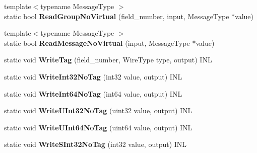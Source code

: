 \begin{DoxyCompactItemize}
{\footnotesize template$<$typename Message\+Type $>$ }\\static bool {\bfseries Read\+Group\+No\+Virtual} (field\+\_\+number, input, Message\+Type $\ast$value)
\item 
\mbox{\label{classgoogle_1_1protobuf_1_1internal_1_1WireFormatLite_a37b58a9b4cd56806106bdeffe647340e}} 
{\footnotesize template$<$typename Message\+Type $>$ }\\static bool {\bfseries Read\+Message\+No\+Virtual} (input, Message\+Type $\ast$value)
\item 
\mbox{\label{classgoogle_1_1protobuf_1_1internal_1_1WireFormatLite_a213c9236ebd73d84441a0db5688ee744}} 
static void {\bfseries Write\+Tag} (field\+\_\+number, Wire\+Type type, output) I\+NL
\item 
\mbox{\label{classgoogle_1_1protobuf_1_1internal_1_1WireFormatLite_a67e66c3c9d0e4c9487b271aae9b150bb}} 
static void {\bfseries Write\+Int32\+No\+Tag} (int32 value, output) I\+NL
\item 
\mbox{\label{classgoogle_1_1protobuf_1_1internal_1_1WireFormatLite_ae6fa7423cbae90a63ae35814c983c592}} 
static void {\bfseries Write\+Int64\+No\+Tag} (int64 value, output) I\+NL
\item 
\mbox{\label{classgoogle_1_1protobuf_1_1internal_1_1WireFormatLite_a0f9fbf660fc2eafb11559a65ff24be3f}} 
static void {\bfseries Write\+U\+Int32\+No\+Tag} (uint32 value, output) I\+NL
\item 
\mbox{\label{classgoogle_1_1protobuf_1_1internal_1_1WireFormatLite_a7845bbe461a6947f36475a345afa67ab}} 
static void {\bfseries Write\+U\+Int64\+No\+Tag} (uint64 value, output) I\+NL
\item 
\mbox{\label{classgoogle_1_1protobuf_1_1internal_1_1WireFormatLite_aaf493b57cc3c6da32b4d296e7c091a28}} 
static void {\bfseries Write\+S\+Int32\+No\+Tag} (int32 value, output) I\+NL

\end{DoxyCompactItemize}
